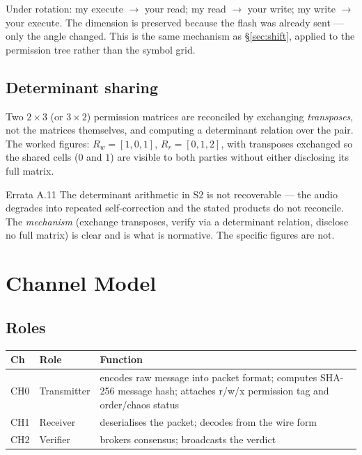 \documentclass[11pt,a4paper]{article}
\begin{document}
Under rotation: my execute $\rightarrow$ your read; my read $\rightarrow$ your
write; my write $\rightarrow$ your execute. The dimension is preserved because
the flash was already sent --- only the angle changed. This is the same
mechanism as \S\ref{sec:shift}, applied to the permission tree rather than the
symbol grid.

\subsection{Determinant sharing}
\label{sec:det}

Two $2\times3$ (or $3\times2$) permission matrices are reconciled by exchanging
\emph{transposes}, not the matrices themselves, and computing a determinant
relation over the pair. The worked figures: $R_w = [1,0,1]$, $R_r = [0,1,2]$,
with transposes exchanged so the shared cells ($0$ and $1$) are visible to both
parties without either disclosing its full matrix.

\begin{errata}{Errata A.11}
The determinant arithmetic in S2 is not recoverable --- the audio degrades into
repeated self-correction and the stated products do not reconcile. The
\emph{mechanism} (exchange transposes, verify via a determinant relation,
disclose no full matrix) is clear and is what is normative. The specific figures
are not.
\end{errata}

\section{Channel Model}
\label{sec:channels}

\subsection{Roles}

\begin{center}
\begin{tabular}{@{}llp{7.6cm}@{}}
\toprule
\textbf{Ch} & \textbf{Role} & \textbf{Function} \\
\midrule
CH0 & Transmitter & encodes raw message into packet format; computes SHA-256
  message hash; attaches r/w/x permission tag and order/chaos status \\
CH1 & Receiver & deserialises the packet; decodes from the wire form \\
CH2 & Verifier & brokers consensus; broadcasts the verdict \\
\bottomrule
\end{tabular}
\end{center}
\end{document}
